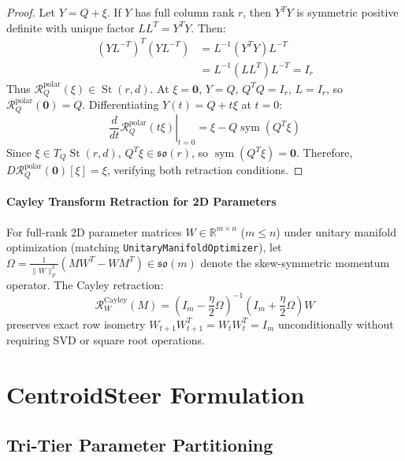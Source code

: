 \documentclass[10pt,twocolumn,letterpaper]{article}
\begin{document}
\begin{proof}
Let $Y = Q + \xi$. If $Y$ has full column rank $r$, then $Y^T Y$ is symmetric positive definite with unique factor $L L^T = Y^T Y$. Then:
\begin{equation}
\begin{aligned}
    (Y L^{-T})^T (Y L^{-T}) &= L^{-1} (Y^T Y) L^{-T} \\
    &= L^{-1} (L L^T) L^{-T} = I_r
\end{aligned}
\end{equation}
Thus $\mathcal{R}_Q^{\text{polar}}(\xi) \in \operatorname{St}(r, d)$. At $\xi = \mathbf{0}$, $Y = Q$, $Q^T Q = I_r$, $L = I_r$, so $\mathcal{R}_Q^{\text{polar}}(\mathbf{0}) = Q$.
Differentiating $Y(t) = Q + t \xi$ at $t = 0$:
\begin{equation}
    \left. \frac{d}{dt} \mathcal{R}_Q^{\text{polar}}(t \xi) \right|_{t=0} = \xi - Q \operatorname{sym}(Q^T \xi)
\end{equation}
Since $\xi \in T_Q \operatorname{St}(r, d)$, $Q^T \xi \in \mathfrak{so}(r)$, so $\operatorname{sym}(Q^T \xi) = \mathbf{0}$. Therefore, $D \mathcal{R}_Q^{\text{polar}}(\mathbf{0})[\xi] = \xi$, verifying both retraction conditions.
\end{proof}

\paragraph{Cayley Transform Retraction for 2D Parameters} For full-rank 2D parameter matrices $W \in \mathbb{R}^{m \times n}$ ($m \le n$) under unitary manifold optimization (matching \texttt{UnitaryManifoldOptimizer}), let $\Omega = \frac{1}{\|W\|_F^2} (M W^T - W M^T) \in \mathfrak{so}(m)$ denote the skew-symmetric momentum operator. The Cayley retraction:
\begin{equation}
    \mathcal{R}_W^{\text{Cayley}}(M) = \left( I_m - \frac{\eta}{2} \Omega \right)^{-1} \left( I_m + \frac{\eta}{2} \Omega \right) W \label{eq:cayley}
\end{equation}
preserves exact row isometry $W_{t+1} W_{t+1}^T = W_t W_t^T = I_m$ unconditionally without requiring SVD or square root operations.

\section{CentroidSteer Formulation}

\subsection{Tri-Tier Parameter Partitioning}
\end{document}
